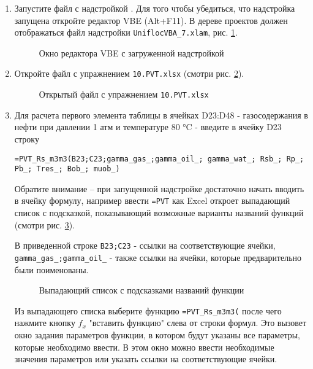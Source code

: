 \begin{enumerate}
	\item Запустите файл с надстройкой \unf. Для того чтобы убедиться, что надстройка запущена откройте редактор VBE (Alt+F11). В дереве проектов должен отображаться файл надстройки \texttt{UniflocVBA_7.xlam}, рис. \ref{ris:VBE_empty}.
	
	\begin{figure}[h!]
		\caption{Окно редактора VBE с загруженной надстройкой \unf}
		\label{ris:VBE_empty}
	\end{figure}

	\item Откройте файл с упражнением \texttt{10.PVT.xlsx} (смотри рис. \ref{ris:Ex10_1}).
	
	\begin{figure}[h!]
		\center{\texttt{[image: Ex10\_1]}}
		\caption{Открытый файл с упражнением \texttt{10.PVT.xlsx}}
		\label{ris:Ex10_1}
	\end{figure}
	
	\item Для расчета первого элемента таблицы в ячейках D23:D48 - газосодержания в нефти при давлении 1 атм и температуре 80 °C - введите в ячейку D23 строку
	
	{ \small  \texttt{=PVT\_Rs\_m3m3(B23;C23;gamma\_gas\_;gamma\_oil\_; gamma\_wat\_; Rsb\_; Rp\_; Pb\_; Tres\_; Bob\_; muob\_)}}
	
	Обратите внимание -- при запущенной надстройке достаточно начать вводить в ячейку формулу, например ввести \texttt{=PVT} как Excel откроет выпадающий список с подсказкой, показывающий возможные варианты названий функций (смотри рис. \ref{ris:Ex10_2}). 
	
	В приведенной строке \texttt{B23;C23} - ссылки на соответствующие ячейки,  \texttt{gamma\_gas\_;gamma\_oil\_} - также ссылки на ячейки, которые предварительно были поименованы. 

	\begin{figure}[h!]
		\center{\texttt{[image: Ex10\_2]}}
		\caption{Выпадающий список с подсказками названий функции}
		\label{ris:Ex10_2}
	\end{figure}

	Из выпадающего списка выберите функцию \texttt{=PVT\_Rs\_m3m3(} после чего нажмите кнопку $f_x$ "вставить функцию" слева от строки формул. Это вызовет окно задания параметров функции, в котором будут указаны все параметры, которые необходимо ввести. В этом окно можно ввести необходимые значения параметров или указать ссылки на соответствующие ячейки.


\end{enumerate}
